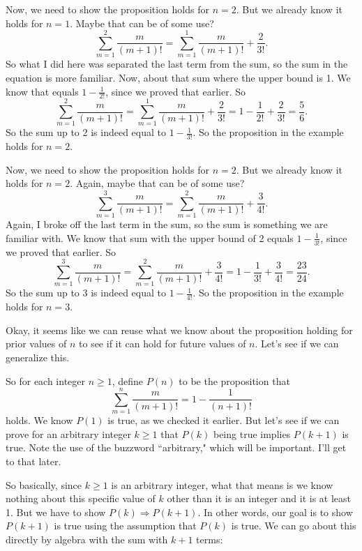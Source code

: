 \documentclass[11pt]{scrartcl}
\begin{document}
Now, we need to show the proposition holds for $n = 2$. But we already know it holds for $n = 1$. Maybe that can be of some use? \[\sum_{m=1}^{2}\frac{m}{(m+1)!} = \sum_{m=1}^{1}\frac{m}{(m+1)!} + \frac{2}{3!}.\] So what I did here was separated the last term from the sum, so the sum in the equation is more familiar. Now, about that sum where the upper bound is 1. We know that equals $1 - \frac{1}{2!}$, since we proved that earlier. So \[\sum_{m=1}^{2}\frac{m}{(m+1)!} = \sum_{m=1}^{1}\frac{m}{(m+1)!} + \frac{2}{3!} = 1 - \frac{1}{2!} + \frac{2}{3!} = \frac{5}{6}.\] So the sum up to 2 is indeed equal to $1 - \frac{1}{3!}$. So the proposition in the example holds for $n = 2$.

Now, we need to show the proposition holds for $n = 2$. But we already know it holds for $n = 2$. Again, maybe that can be of some use? \[\sum_{m=1}^{3}\frac{m}{(m+1)!} = \sum_{m=1}^{2}\frac{m}{(m+1)!} + \frac{3}{4!}.\] Again, I broke off the last term in the sum, so the sum is something we are familiar with. We know that sum with the upper bound of 2 equals $1 - \frac{1}{3!}$, since we proved that earlier. So \[\sum_{m=1}^{3}\frac{m}{(m+1)!} = \sum_{m=1}^{2}\frac{m}{(m+1)!} + \frac{3}{4!} = 1 - \frac{1}{3!} + \frac{3}{4!} = \frac{23}{24}.\] So the sum up to 3 is indeed equal to $1 - \frac{1}{4!}$. So the proposition in the example holds for $n = 3$.

Okay, it seems like we can reuse what we know about the proposition holding for prior values of $n$ to see if it can hold for future values of $n$. Let's see if we can generalize this.

So for each integer $n \geq 1$, define $P(n)$ to be the proposition that \[\sum_{m=1}^{n}\frac{m}{(m+1)!} = 1 - \frac{1}{(n+1)!}\] holds. We know $P(1)$ is true, as we checked it earlier. But let's see if we can prove for an arbitrary integer $k \geq 1$ that $P(k)$ being true implies $P(k+1)$ is true. Note the use of the buzzword ``arbitrary," which will be important. I'll get to that later.

So basically, since $k \geq 1$ is an arbitrary integer, what that means is we know nothing about this specific value of $k$ other than it is an integer and it is at least 1. But we have to show $P(k) \Rightarrow P(k+1)$. In other words, our goal is to show $P(k+1)$ is true using the assumption that $P(k)$ is true. We can go about this directly by algebra with the sum with $k+1$ terms:
\end{document}
